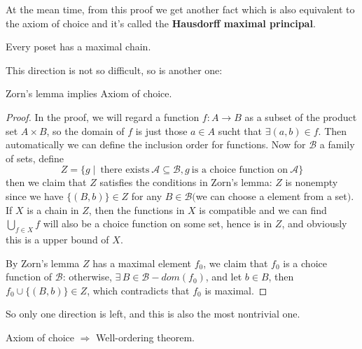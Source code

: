At the mean time, from this proof we get another fact which is also equivalent to the axiom of choice and it's called the \textbf{Hausdorff maximal principal}.
\begin{theorem}
Every poset has a maximal chain.
\end{theorem}
This direction is not so difficult, so is another one:
\begin{theorem}
Zorn's lemma implies Axiom of choice.
\end{theorem}
\begin{proof}
In the proof, we will regard a function $f:A\to B$ as a subset of the product set $A\times B$, so the domain of $f$ is just those $a\in A$ sucht that $\exists (a,b)\in f$. Then automatically we can define the inclusion order for functions. Now for $\mathscr{B}$ a family of sets, define
\[Z=\{g\mid\ \text{there exists}\ \mathscr{A}\subseteq \mathscr{B}, g\ \text{is a choice function on}\ \mathscr{A}\}\]
then we claim that $Z$ satisfies the conditions in Zorn's lemma: $Z$ is nonempty since we have $\{(B,b)\}\in Z$ for any $B\in\mathscr{B}$$($we can choose a element from a set$)$. If $X$ is a chain in $Z$, then the functions in $X$ is compatible and we can find $\bigcup\limits_{f\in X}f$ will also be a choice function on some set, hence is in $Z$, and obviously this is a upper bound of $X$.\par
By Zorn's lemma $Z$ has a maximal element $f_0$, we claim that $f_0$ is a choice function of $\mathscr{B}$: otherwise, $\exists\,B\in\mathscr{B}-dom(f_0)$, and let $b\in B$, then $f_0\cup\{(B,b)\}\in Z$, which contradicts that $f_0$ is maximal.
\end{proof}
So only one direction is left, and this is also the most nontrivial one.
\begin{theorem}
Axiom of choice $\Rightarrow$ Well-ordering theorem.
\end{theorem}
